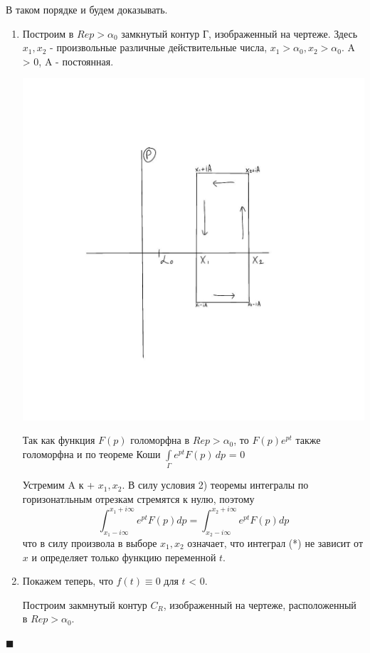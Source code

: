 \documentclass[a4paper, 12pt]{report}
\newenvironment{Proof}
{\par\noindent{\bf Доказательство.}}
{\hfill$\scriptstyle\blacksquare$}
\begin{document}
\begin{Proof}
В таком порядке и будем доказывать.
\begin{enumerate}
    \item Построим в {$Rep>\alpha_0$} замкнутый контур Г, изображенный на чертеже. Здесь {$x_1, x_2$} - произвольные различные действительные числа, {$x_1>\alpha_0, x_2>\alpha_0$}. A > 0, A - постоянная.
     \begin{center}
        \includegraphics[width=12 cm]{mellin/3.jpg}
    \end{center}
    Так как функция {$F(p)$} голоморфна в  {$Rep>\alpha_0$}, то {$F(p)e^{pt}$} также голоморфна и по теореме Коши {$\int\limits_\Gamma e^{pt}F(p)\,dp$} = 0
   
    Устремим A к +\infty {} {$x_1, x_2$}. В силу условия 2) теоремы интегралы по горизонатльным отрезкам стремятся к нулю, поэтому
    $$\int_{x_1-i\infty}^{x_1+i\infty}e^{pt}F(p)dp = \int_{x_2-i\infty}^{x_2+i\infty}e^{pt}F(p)dp$$ что в силу произвола в выборе {$x_1, x_2$} означает, что интеграл (*) не зависит от {$x$} и определяет только функцию переменной {$t$}.
    \item Покажем теперь, что {$f(t)\equiv0$} для {$t$} < 0.
    
    Построим закмнутый контур {$C_R$}, изображенный на чертеже, расположенный в {$Rep>\alpha_0$}.
    

\end{enumerate}
\end{Proof}
\end{document}
